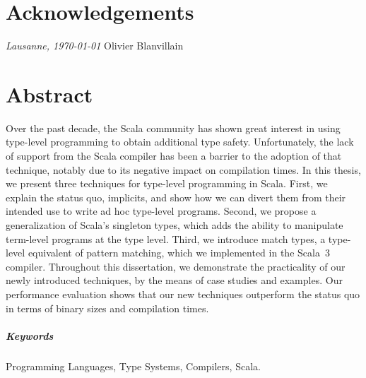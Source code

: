 



\frontmatter

\setcounter{page}{0}

\chapter{Acknowledgements}
\lipsum[1-2]

\bigskip
\noindent\textit{Lausanne, \today}
\hfill Olivier Blanvillain

\cleardoublepage
\chapter*{Abstract} %

Over the past decade, the Scala community has shown great interest in using type-level programming to obtain additional type safety.
Unfortunately, the lack of support from the Scala compiler has been a barrier to the adoption of that technique, notably due to its negative impact on compilation times.
In this thesis, we present three techniques for type-level programming in Scala.
First, we explain the status quo, implicits, and show how we can divert them from their intended use to write ad hoc type-level programs.
Second, we propose a generalization of Scala's singleton types, which adds the ability to manipulate term-level programs at the type level.
Third, we introduce match types, a type-level equivalent of pattern matching, which we implemented in the Scala~3 compiler.
Throughout this dissertation, we demonstrate the practicality of our newly introduced techniques, by the means of case studies and examples.
Our performance evaluation shows that our new techniques outperform the status quo in terms of binary sizes and compilation times.

\paragraph{Keywords} Programming Languages, Type Systems, Compilers, Scala.

